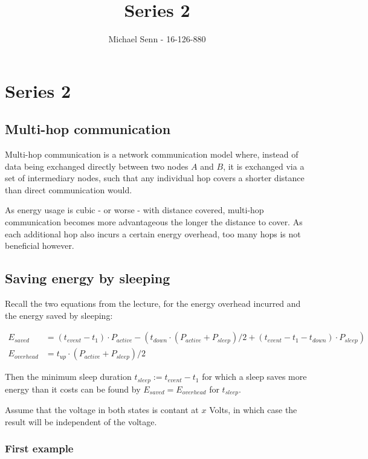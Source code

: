 \documentclass[a4paper]{scrreprt}
\title{Series 2}
\author{Michael Senn \maillink{michael.senn@students.unibe.ch} - 16-126-880}
\date{\printdate}
\begin{document}
\maketitle


\setcounter{chapter}{1}

\chapter{Series 2}

\section{Multi-hop communication}

Multi-hop communication is a network communication model where, instead of data
being exchanged directly between two nodes $A$ and $B$, it is exchanged via a
set of intermediary nodes, such that any individual hop covers a shorter
distance than direct communication would.

As energy usage is cubic - or worse - with distance covered, multi-hop
communication becomes more advantageous the longer the distance to cover. As
each additional hop also incurs a certain energy overhead, too many hops is not
beneficial however.

\section{Saving energy by sleeping}

Recall the two equations from the lecture, for the energy overhead incurred and
the energy saved by sleeping:

\begin{align*}
		E_{saved} & = (t_{event} - t_1) \cdot P_{active} - (t_{down} \cdot (P_{active} + P_{sleep}) / 2 + (t_{event} - t_1 - t_{down}) \cdot P_{sleep}) \\
		E_{overhead} & = t_{up} \cdot(P_{active} + P_{sleep}) / 2
\end{align*}

Then the minimum sleep duration $t_{sleep} := t_{event} - t_{1}$ for which a
sleep saves more energy than it costs can be found by $E_{saved} =
E_{overhead}$ for $t_{sleep}$.

Assume that the voltage in both states is contant at $x$ Volts, in which case
the result will be independent of the voltage.

\subsection{First example}
\end{document}
